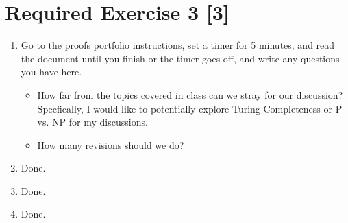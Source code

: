 \documentclass{article}
\begin{document}
\section*{Required Exercise 3 [3]}
\begin{enumerate}
    \item {
        Go to the proofs portfolio instructions, set a timer for 5 minutes, and read the document until you finish or the timer goes off, and write any questions you have here.
        \begin{itemize}
            \item {
                How far from the topics covered in class can we stray for our discussion?
                Specfically, I would like to potentially explore Turing Completeness 
                or P vs. NP for my discussions. 
            }

            \item{
                How many revisions should we do? 
            }
        \end{itemize}
    }

    \item {
        Done.
    }

    \item {
        Done.
    }

    \item {
        Done.
    }
\end{enumerate}
\end{document}
